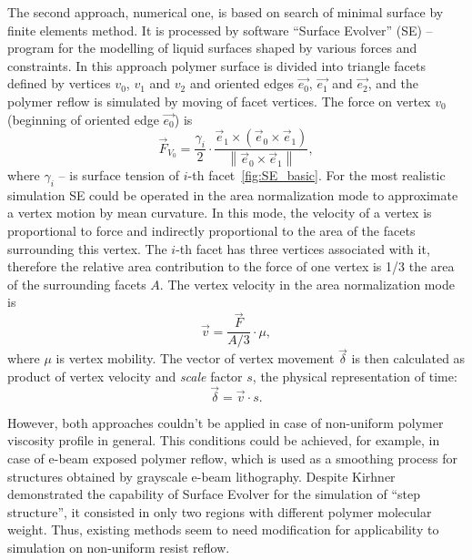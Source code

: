 \documentclass[12pt, letterpaper]{article}
\begin{document}
The second approach, numerical one, is based on search of minimal surface by finite elements method. It is processed by software ``Surface Evolver'' (SE) -- program for the modelling of liquid surfaces shaped by various forces and constraints. In this approach polymer surface is divided into triangle facets defined by vertices $v_0$, $v_1$ and $v_2$ and oriented edges $\vec{e_0}$, $\vec{e_1}$ and $\vec{e_2}$, and the polymer reflow is simulated by moving of facet vertices. The force on vertex $v_0$ (beginning of oriented edge $\vec{e_0}$) is
\begin{equation}
	\vec{F}_{V_0}=\frac{\gamma_i}{2} \cdot \frac{\vec{e}_1 \times\left(\vec{e}_0 \times \vec{e}_1\right)}{\left\|\vec{e}_0 \times \vec{e}_1\right\|},
\end{equation}
where $\gamma_i$ -- is surface tension of $i$-th facet~\ref{fig:SE_basic}. For the most realistic simulation SE could be operated in the area normalization mode to approximate a vertex motion by mean curvature. In this mode, the velocity of a vertex is proportional to force and indirectly proportional to the area of the facets surrounding this vertex. The $i$-th facet has three vertices associated with it, therefore the relative area contribution to the force of one vertex is 1/3 the area of the surrounding facets $A$. The vertex velocity in the area normalization mode is
\begin{equation}
	\vec{v} = \frac{\vec{F}}{A/3} \cdot \mu,
\end{equation}
where $\mu$ is vertex mobility. The vector of vertex movement $\vec{\delta}$ is then calculated as product of vertex velocity and \textit{scale} factor $s$, the physical representation of time:
\begin{equation} \label{eq:SE_delta}
	\vec{\delta} = \vec{v} \cdot s.
\end{equation}



However, both approaches couldn't be applied in case of non-uniform polymer viscosity profile in general. This conditions could be achieved, for example, in case of e-beam exposed polymer reflow, which is used as a smoothing process for structures obtained by grayscale e-beam lithography. Despite Kirhner demonstrated the capability of Surface Evolver for the simulation of ``step structure'', it consisted in only two regions with different polymer molecular weight. Thus, existing methods seem to need modification for applicability to simulation on non-uniform resist reflow.
\end{document}
